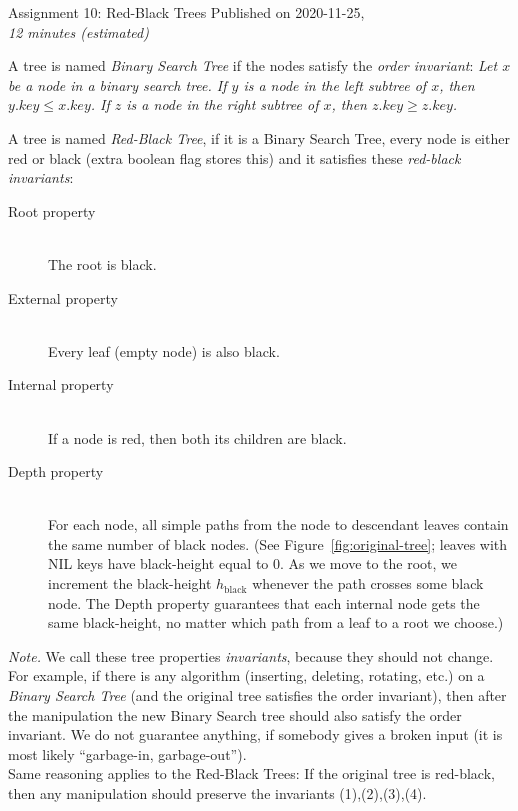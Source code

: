 \documentclass[a4paper,12pt]{article}
\begin{document}

\thispagestyle{empty}

\begin{center}
{\Large Assignment 10: Red-Black Trees}
{\Large Published on 2020-11-25,}\\
{\em 12 minutes (estimated)} 
\end{center}

\noindent

A tree is named {\em Binary Search Tree} if the nodes satisfy the {\em order invariant}:
{\em Let $x$ be a node in a binary search tree. If $y$ is a node in the left subtree
of $x$, then $y.key \leq x.key$. If $z$ is a node in the right subtree of $x$, then
$z.key \geq z.key$.}

\vspace{10pt} A tree is named {\em Red-Black Tree}, if it is a Binary Search Tree, 
every node is either red or black (extra boolean flag stores this) and 
it satisfies these {\em red-black invariants}:
\begin{description}
\item[Root property] \hfill \\ The root is black.
\item[External property] \hfill \\ Every leaf (empty node) is also black.
\item[Internal property] \hfill \\  If a node is red, then both its children are black.
\item[Depth property] \hfill \\ For each node, all simple paths from the node to descendant leaves contain the
same number of black nodes. (See Figure~\ref{fig:original-tree}; leaves with NIL keys have 
black-height equal to $0$. As we move to the root, we increment 
the black-height $h_\text{black}$ whenever the path crosses some black node. 
The Depth property guarantees that each internal node gets the same black-height, no matter
which path from a leaf to a root we choose.)

\end{description}


{\em Note.} We call these tree properties {\em invariants}, because they should not change. 
For example, if there is any algorithm (inserting, deleting, rotating, etc.) on a {\em Binary Search Tree}
(and the original tree satisfies the order invariant), then after the manipulation the new 
Binary Search tree should also satisfy the order invariant.
We do not guarantee anything, if somebody gives a broken input (it is most likely 
``garbage-in, garbage-out'').\\
Same reasoning applies to the Red-Black Trees: If the original tree is red-black, then 
any manipulation should preserve the invariants (1),(2),(3),(4).
\end{document}
